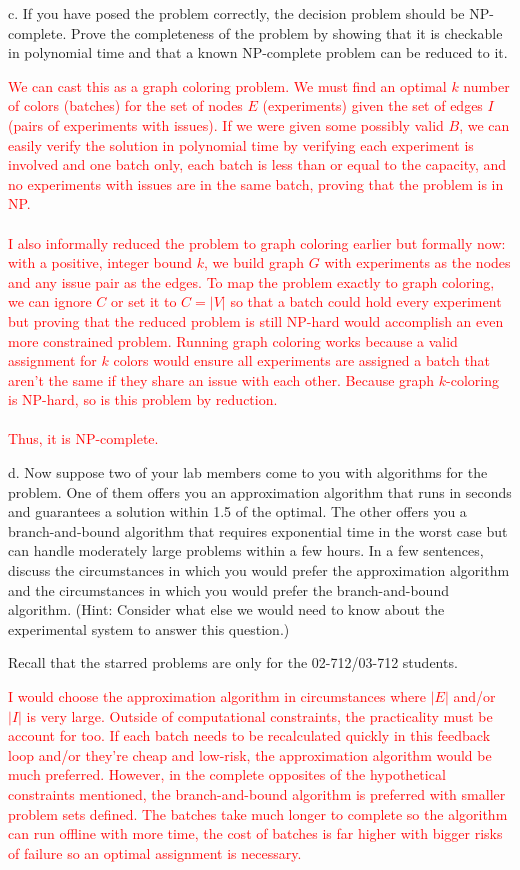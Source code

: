 \documentclass[11pt]{article}
\begin{document}
c. If you have posed the problem correctly, the decision problem
should be NP-complete.  Prove the completeness of the problem by
showing that it is checkable in polynomial time and that a known
NP-complete problem can be reduced to it.

\textcolor{red}{
We can cast this as a graph coloring problem. We must find an optimal $k$ number of colors (batches) for the set of nodes $E$ (experiments) given the set of edges $I$ (pairs of experiments with issues). If we were given some possibly valid $B$, we can easily verify the solution in polynomial time by verifying each experiment is involved and one batch only, each batch is less than or equal to the capacity, and no experiments with issues are in the same batch, proving that the problem is in NP.\\\\
I also informally reduced the problem to graph coloring earlier but formally now: with a positive, integer bound $k$, we build graph $G$ with experiments as the nodes and any issue pair as the edges. To map the problem exactly to graph coloring, we can ignore $C$ or set it to $C = |V|$ so that a batch could hold every experiment but proving that the reduced problem is still NP-hard would accomplish an even more constrained problem. Running graph coloring works because a valid assignment for $k$ colors would ensure all experiments are assigned a batch that aren't the same if they share an issue with each other. Because graph $k$-coloring is NP-hard, so is this problem by reduction.\\\\
Thus, it is NP-complete.
}

d. Now suppose two of your lab members come to you with algorithms for
the problem.  One of them offers you an approximation algorithm that
runs in seconds and guarantees a solution within 1.5 of the optimal.
The other offers you a branch-and-bound algorithm that requires
exponential time in the worst case but can handle moderately large
problems within a few hours.  In a few sentences, discuss the
circumstances in which you would prefer the approximation algorithm
and the circumstances in which you would prefer the branch-and-bound
algorithm.  (Hint: Consider what else we would need to know about the
experimental system to answer this question.)

{\bf *} Recall that the starred problems are only for the 02-712/03-712
students.

\textcolor{red}{
I would choose the approximation algorithm in circumstances where $|E|$ and/or $|I|$ is very large. Outside of computational constraints, the practicality must be account for too. If each batch needs to be recalculated quickly in this feedback loop and/or they're cheap and low-risk, the approximation algorithm would be much preferred. However, in the complete opposites of the hypothetical constraints mentioned, the branch-and-bound algorithm is preferred with smaller problem sets defined. The batches take much longer to complete so the algorithm can run offline with more time, the cost of batches is far higher with bigger risks of failure so an optimal assignment is necessary.
}
\end{document}
